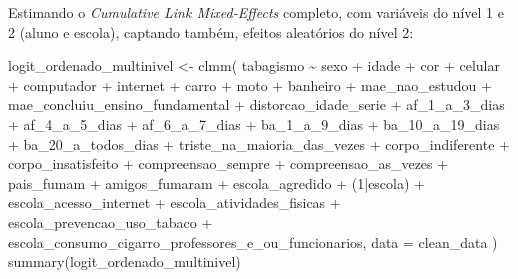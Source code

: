 \documentclass[
]{article}
\newenvironment{Shaded}{\begin{snugshade}}{\end{snugshade}}
\newcommand{\AttributeTok}[1]{\textcolor[rgb]{0.40,0.45,0.13}{#1}}
\newcommand{\DecValTok}[1]{\textcolor[rgb]{0.68,0.00,0.00}{#1}}
\newcommand{\FunctionTok}[1]{\textcolor[rgb]{0.28,0.35,0.67}{#1}}
\newcommand{\NormalTok}[1]{\textcolor[rgb]{0.00,0.23,0.31}{#1}}
\newcommand{\OtherTok}[1]{\textcolor[rgb]{0.00,0.23,0.31}{#1}}
\newcommand{\SpecialCharTok}[1]{\textcolor[rgb]{0.37,0.37,0.37}{#1}}
\begin{document}
Estimando o \emph{Cumulative Link Mixed-Effects} completo, com variáveis
do nível 1 e 2 (aluno e escola), captando também, efeitos aleatórios do
nível 2:

\begin{Shaded}
\begin{Highlighting}[]
\NormalTok{logit\_ordenado\_multinivel }\OtherTok{\textless{}{-}} \FunctionTok{clmm}\NormalTok{(}
\NormalTok{  tabagismo }\SpecialCharTok{\textasciitilde{}}\NormalTok{ sexo }\SpecialCharTok{+}\NormalTok{ idade }\SpecialCharTok{+}\NormalTok{ cor }\SpecialCharTok{+}\NormalTok{ celular }\SpecialCharTok{+}\NormalTok{ computador }\SpecialCharTok{+}
\NormalTok{  internet }\SpecialCharTok{+}\NormalTok{ carro }\SpecialCharTok{+}\NormalTok{ moto }\SpecialCharTok{+}\NormalTok{ banheiro }\SpecialCharTok{+}
\NormalTok{  mae\_nao\_estudou }\SpecialCharTok{+}
\NormalTok{  mae\_concluiu\_ensino\_fundamental }\SpecialCharTok{+}
\NormalTok{  distorcao\_idade\_serie }\SpecialCharTok{+}\NormalTok{ af\_1\_a\_3\_dias }\SpecialCharTok{+}\NormalTok{ af\_4\_a\_5\_dias }\SpecialCharTok{+}
\NormalTok{  af\_6\_a\_7\_dias }\SpecialCharTok{+}\NormalTok{ ba\_1\_a\_9\_dias }\SpecialCharTok{+}\NormalTok{ ba\_10\_a\_19\_dias }\SpecialCharTok{+}
\NormalTok{  ba\_20\_a\_todos\_dias }\SpecialCharTok{+}
\NormalTok{  triste\_na\_maioria\_das\_vezes }\SpecialCharTok{+}\NormalTok{ corpo\_indiferente }\SpecialCharTok{+}
\NormalTok{  corpo\_insatisfeito }\SpecialCharTok{+}\NormalTok{ compreensao\_sempre }\SpecialCharTok{+}
\NormalTok{  compreensao\_as\_vezes }\SpecialCharTok{+}\NormalTok{ pais\_fumam }\SpecialCharTok{+}\NormalTok{ amigos\_fumaram }\SpecialCharTok{+} 
\NormalTok{  escola\_agredido }\SpecialCharTok{+}
\NormalTok{  (}\DecValTok{1}\SpecialCharTok{|}\NormalTok{escola) }\SpecialCharTok{+}\NormalTok{ escola\_acesso\_internet }\SpecialCharTok{+}
\NormalTok{  escola\_atividades\_fisicas }\SpecialCharTok{+}
\NormalTok{  escola\_prevencao\_uso\_tabaco }\SpecialCharTok{+}
\NormalTok{  escola\_consumo\_cigarro\_professores\_e\_ou\_funcionarios,}
  \AttributeTok{data =}\NormalTok{ clean\_data}
\NormalTok{)}
\FunctionTok{summary}\NormalTok{(logit\_ordenado\_multinivel)}
\end{Highlighting}
\end{Shaded}
\end{document}
